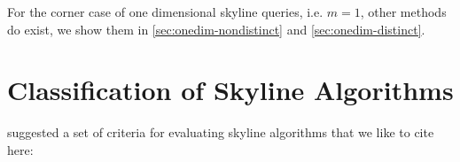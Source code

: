 For the corner case of one dimensional skyline queries, i.e. $m = 1$,
other methods do exist, we show them in
\autoref{sec:onedim-nondistinct} and \ref{sec:onedim-distinct}.


\section{Classification of Skyline Algorithms}
%
%
%
%
%
%

\citet{Kossmann2002} suggested a set of criteria for evaluating skyline algorithms that we like to cite here:

